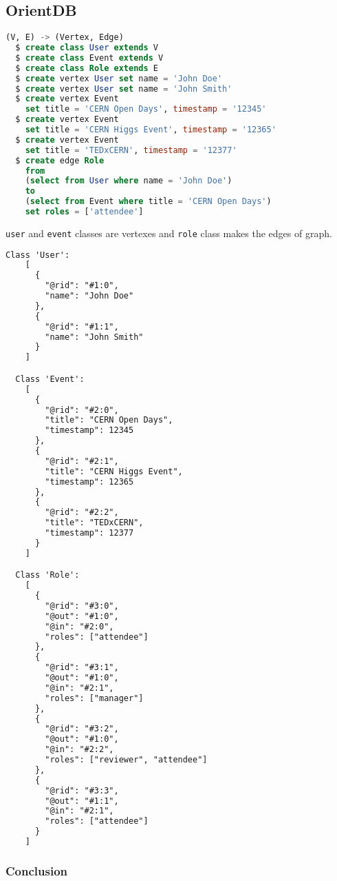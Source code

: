 \subsection{OrientDB}

\begin{lstlisting}[language=SQL, caption=Dashboard Schema in OrientDB]
  (V, E) -> (Vertex, Edge)
  $ create class User extends V
  $ create class Event extends V
  $ create class Role extends E
  $ create vertex User set name = 'John Doe'
  $ create vertex User set name = 'John Smith'
  $ create vertex Event 
    set title = 'CERN Open Days', timestamp = '12345'
  $ create vertex Event
    set title = 'CERN Higgs Event', timestamp = '12365'
  $ create vertex Event
    set title = 'TEDxCERN', timestamp = '12377'
  $ create edge Role
    from
    (select from User where name = 'John Doe')
    to
    (select from Event where title = 'CERN Open Days')
    set roles = ['attendee']
\end{lstlisting}

\texttt{user} and \texttt{event} classes are vertexes and \texttt{role} class makes the edges of graph. \vspace{1cm}

\begin{lstlisting}[language=HTML, caption=Example Dashboard Data in OrientDB]
  Class 'User':
    [
      {
        "@rid": "#1:0",
        "name": "John Doe"
      },
      {
        "@rid": "#1:1",
        "name": "John Smith"
      }
    ]

  Class 'Event':
    [
      {
        "@rid": "#2:0",
        "title": "CERN Open Days",
        "timestamp": 12345
      },
      {
        "@rid": "#2:1",
        "title": "CERN Higgs Event",
        "timestamp": 12365
      },
      {
        "@rid": "#2:2",
        "title": "TEDxCERN",
        "timestamp": 12377
      }
    ]

  Class 'Role':
    [
      {
        "@rid": "#3:0",
        "@out": "#1:0",
        "@in": "#2:0",
        "roles": ["attendee"]
      },
      {
        "@rid": "#3:1",
        "@out": "#1:0",
        "@in": "#2:1",
        "roles": ["manager"]
      },
      {
        "@rid": "#3:2",
        "@out": "#1:0",
        "@in": "#2:2",
        "roles": ["reviewer", "attendee"]
      },
      {
        "@rid": "#3:3",
        "@out": "#1:1",
        "@in": "#2:1",
        "roles": ["attendee"]
      }
    ]

\end{lstlisting}

\subsubsection*{Conclusion}

